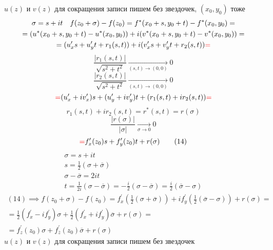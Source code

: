 \documentclass[main]{subfiles}
\begin{document}
    $u(z)$ и $v(z)$ для сокращения записи пишем без звездочек, $(x_0, y_0)$ тоже
    \begin{multline*}
        \sigma = s + it \quad f(z_0+\sigma) - f(z_0) = f^*(x_0 + s, y_0 + t) - f^*(x_0,y_0) = \\
        = (u^*(x_0 + s, y_0 + t) - u^*(x_0,y_0)) + i(v^*(x_0 + s, y_0 + t) - v^*(x_0,y_0)) = \\
        = (u^\prime_xs + u^\prime_yt + r_1(s,t))+i(v^\prime_x s + v^\prime_y t + r_2(s,t)) \textcolor{red}{ = }
    \end{multline*}
    \[ \frac{|r_1(s,t)|}{\sqrt{s^2+t^2}} \underset{(s,t) \to (0,0)}{\longrightarrow} 0 \] 
    \[ \frac{|r_2(s,t)|}{\sqrt{s^2+t^2}} \underset{(s,t) \to (0,0)}{\longrightarrow} 0 \]
    \[ \textcolor{red}{ = } (u^\prime_x + i v^\prime_x)s + (u^\prime_y + iv^\prime_y)t +(r_1(s,t) + ir_2(s,t)) \textcolor{red}{ = } \]
    \[ r_1(s,t) + ir_2(s,t) = r^*(s,t) = r(\sigma) \]
    \[\frac{|r(\sigma)|}{|\sigma|} \underset{\sigma \to 0}{\longrightarrow} 0 \tag{14\prime} \]
    \[ \textcolor{red}{ = } f^\prime_x(z_0)s + f^\prime_y(z_0)t + r(\sigma) \tag{14} \]
    \begin{gather*}
        \sigma = s + it \\
        s = \frac{1}{2}(\sigma + \overline{\sigma}) \\
        \sigma - \overline{\sigma} = 2it \\
        t = \frac{1}{2i}(\sigma - \overline{\sigma}) = - \frac{i}{2}(\sigma - \overline{\sigma}) = \frac{i}{2}(\overline{\sigma}-\sigma) 
    \end{gather*}
    \begin{multline*}
        (14) \implies f(z_0 + \sigma) - f(z_0) = f^\prime_x(\frac{1}{2}(\sigma + \overline{\sigma})) + if^\prime_y(\frac{1}{2}(\overline{\sigma} - \sigma)) + r(\sigma) = \\
        = \frac{1}{2}(f^\prime_x - if^\prime_y) \sigma + \frac{1}{2}(f^\prime_x + if^\prime_y) \overline{\sigma} + r(\sigma) = \\
        = f^\prime_z(z_0)\sigma + f^\prime_{\overline{z}}(z_0) \overline{\sigma} + r(\sigma) \tag{15}
    \end{multline*}
$u(z)$ и $v(z)$ для сокращения записи пишем без звездочек
\end{document}
